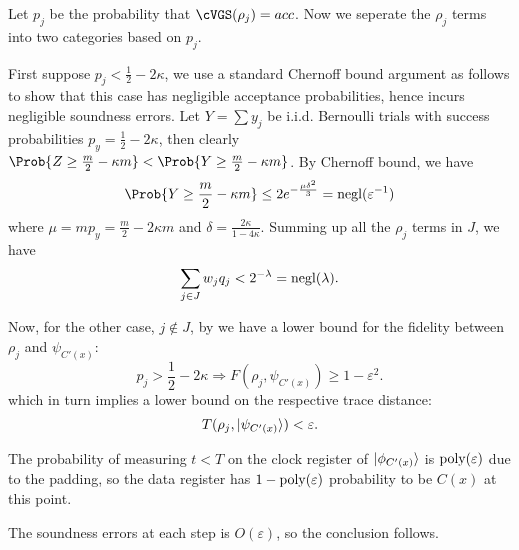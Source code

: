 \begin{prf}
	Let $p_j$ be the probability that $\cVGS(\rho_j)=acc$. Now we seperate the $\rho_j$ terms into two categories based on $p_j$.

	First suppose $p_j<\frac{1}{2}-2\kappa$, we use a standard Chernoff bound argument as follows to show that this case has negligible acceptance probabilities,
	hence incurs negligible soundness errors.
	Let $Y=\sum y_j$ be i.i.d. Bernoulli trials with success probabilities $p_y=\frac{1}{2}-2\kappa$,
	then clearly $\Prob{Z\geq\frac{m}{2}-\kappa m}<\Prob{Y\geq\frac{m}{2}-\kappa m}$.
	By Chernoff bound, we have
	$$\Prob{Y\geq\frac{m}{2}-\kappa m}\leq2e^{-\frac{\mu\delta^2}{3}}=\negl(\varepsilon^{-1})$$
	where $\mu=mp_y=\frac{m}{2}-2\kappa m$ and $\delta=\frac{2\kappa}{1-4\kappa}$.
	Summing up all the $\rho_j$ terms in $J$, we have
	$$\sum_{j\in J} w_j q_j<2^{-\lambda}=\operatorname{negl}(\lambda).$$

    
	Now, for the other case, $j\notin J$, by  we have a lower bound for the fidelity between $\rho_j$ and $\psi_{C'(x)}$:
	$$p_j>\frac{1}{2}-2\kappa\Rightarrow F(\rho_j, \psi_{C'(x)})\geq1-\varepsilon^2.$$
	which in turn implies a lower bound on the respective trace distance:
	$$T(\rho_j, \ket{\psi_{C'(x)}})<\varepsilon.$$

	The probability of measuring $t<T$ on the clock register of $\ket{\phi_{C'(x)}}$ is $\operatorname*{\operatorname{poly}}(\varepsilon)$ due to the padding,
	so the data register has $1-\operatorname*{\operatorname{poly}}(\varepsilon)$ probability to be $C(x)$ at this point. 

	The soundness errors at each step is $O(\varepsilon)$, so the conclusion follows.
\end{prf}
